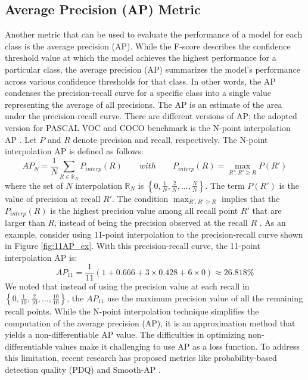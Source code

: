 \subsection{Average Precision (AP) Metric}  \label{subsec:ap_metric}
Another metric that can be used to evaluate the performance of a model for each class is the average precision (AP). While the F-score describes the confidence threshold value at which the model achieves the highest performance for a particular class, the average precision (AP) summarizes the model's performance across various confidence thresholds for that class. In other words, the AP condenses the precision-recall curve for a specific class into a single value representing the average of all precisions. The AP is an estimate of the area under the precision-recall curve. There are different versions of AP; the adopted version for PASCAL VOC and COCO benchmark is the N-point interpolation AP \cite{n_point_interpolation_ap}. Let $P$ and $R$ denote precision and recall, respectively. The N-point interpolation AP is defined as follows:
\begin{equation}
    AP_N = \frac{1}{N} \sum_{R \in \mathbb{R}_N} P_{interp}(R) \qquad with \qquad P_{interp}(R) = \max_{{R}':{R}' \geq R} P({R}')
\end{equation}
where the set of $N$ interpolation $\mathbb{R}_N$ is $\left\{0, \frac{1}{N}, \frac{2}{N}, ..., \frac{N}{N}\right\}$. The term $P({R}')$ is the value of precision at recall ${R}'$. The condition $\max_{{R}':{R}' \geq R}$ implies that the $P_{interp}(R)$ is the highest precision value among all recall point ${R}'$ that are larger than $R$, instead of being the precision observed at the recall $R$ \cite{n_point_interpolation_ap}. As an example, consider using 11-point interpolation to the precision-recall curve shown in Figure \ref{fig:11AP_ex}. With this precision-recall curve, the 11-point interpolation AP is:
\begin{equation*}
    AP_{11} = \frac{1}{11} (1+0.666+3 \times 0.428 + 6 \times 0) \approx 26.818\% 
\end{equation*}
We noted that instead of using the precision value at each recall in $\left\{0, \frac{1}{10}, \frac{2}{10}, ..., \frac{10}{10}\right\}$, the $AP_{11}$ use the maximum precision value of all the remaining recall points. While the N-point interpolation technique simplifies the computation of the average precision (AP), it is an approximation method that yields a non-differentiable AP value. The difficulties in optimizing non-differentiable values make it challenging to use AP as a loss function. To address this limitation, recent research has proposed metrics like probability-based detection quality (PDQ) and Smooth-AP \cite{pdq_metric_2020, smoth_ap_metric_2020}.


